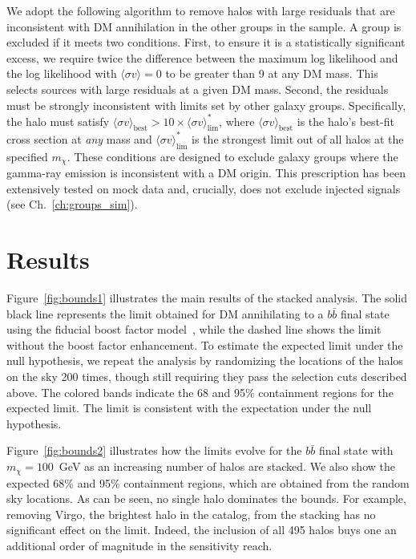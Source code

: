 We adopt the following algorithm to remove halos with large residuals that are inconsistent with DM annihilation in the other groups in the sample. A group is excluded if it meets two conditions. First, to ensure it is a statistically significant excess, we require twice the difference between the maximum log likelihood and the log likelihood with $\langle \sigma v \rangle = 0$ to be greater than 9 at any DM mass. This selects sources with large residuals at a given DM mass.  Second, the residuals must be strongly inconsistent with limits set by other galaxy groups. Specifically, the halo  must satisfy $\langle\sigma v\rangle_\text{best} > 10 \times \langle\sigma v\rangle^*_\text{lim}$, where $\langle\sigma v\rangle_\text{best}$ is the halo's best-fit cross section at \emph{any} mass and $\langle\sigma v\rangle^*_\text{lim}$ is the strongest limit out of all halos at the specified $m_\chi$. These conditions are designed to exclude galaxy groups where the gamma-ray emission is inconsistent with a DM origin.  This prescription has been extensively tested on mock data and, crucially, does not exclude injected signals (see Ch.~\ref{ch:groups_sim}).

\section{Results}

Figure~\ref{fig:bounds1} illustrates the main results of the stacked analysis.  The solid black line represents the limit obtained for DM annihilating to a $b \bar b$ final state using the fiducial boost factor model~\cite{Bartels:2015uba}, while the dashed line  shows the limit without the boost factor enhancement.  To estimate the expected limit under the null hypothesis, we repeat the analysis by randomizing the locations of the halos on the sky 200 times, though still requiring they pass the selection cuts described above.  
The colored bands indicate the 68 and 95\% containment regions for the expected limit.  
The limit is consistent with the expectation under the null hypothesis.

Figure~\ref{fig:bounds2} illustrates how the limits evolve for the $b \bar b$ final state with $m_\chi = 100$~GeV as an increasing number of halos are stacked.  We also show the expected 68\% and 95\% containment regions, which are obtained from the random sky locations.  As can be seen, no single halo dominates the bounds.  For example, removing Virgo, the brightest halo in the catalog, from the stacking has no significant effect on the limit.  Indeed, the inclusion of all 495 halos buys one an additional order of magnitude in the sensitivity reach.

